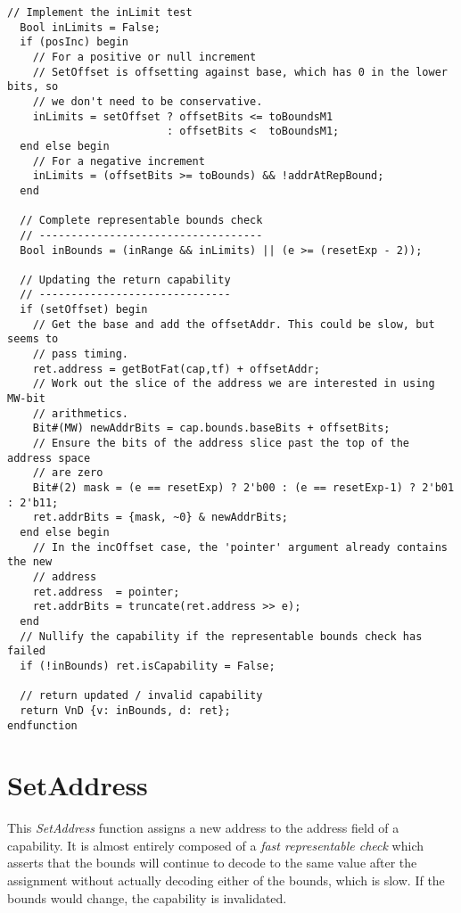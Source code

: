 \begin{lstlisting}[language=bluespec]
  // Implement the inLimit test
  Bool inLimits = False;
  if (posInc) begin
    // For a positive or null increment
    // SetOffset is offsetting against base, which has 0 in the lower bits, so
    // we don't need to be conservative.
    inLimits = setOffset ? offsetBits <= toBoundsM1
                         : offsetBits <  toBoundsM1;
  end else begin
    // For a negative increment
    inLimits = (offsetBits >= toBounds) && !addrAtRepBound;
  end

  // Complete representable bounds check
  // -----------------------------------
  Bool inBounds = (inRange && inLimits) || (e >= (resetExp - 2));

  // Updating the return capability
  // ------------------------------
  if (setOffset) begin
    // Get the base and add the offsetAddr. This could be slow, but seems to
    // pass timing.
    ret.address = getBotFat(cap,tf) + offsetAddr;
    // Work out the slice of the address we are interested in using MW-bit
    // arithmetics.
    Bit#(MW) newAddrBits = cap.bounds.baseBits + offsetBits;
    // Ensure the bits of the address slice past the top of the address space
    // are zero
    Bit#(2) mask = (e == resetExp) ? 2'b00 : (e == resetExp-1) ? 2'b01 : 2'b11;
    ret.addrBits = {mask, ~0} & newAddrBits;
  end else begin
    // In the incOffset case, the 'pointer' argument already contains the new
    // address
    ret.address  = pointer;
    ret.addrBits = truncate(ret.address >> e);
  end
  // Nullify the capability if the representable bounds check has failed
  if (!inBounds) ret.isCapability = False;

  // return updated / invalid capability
  return VnD {v: inBounds, d: ret};
endfunction
\end{lstlisting}

\section{SetAddress}
\label{sec:cheri-128-listings-setaddress}

This \emph{SetAddress} function assigns a new address to the address field
of a capability.
It is almost entirely composed of a \emph{fast representable check} which asserts
that the bounds will continue to decode to the same value after the assignment
without actually decoding either of the bounds, which is slow.
If the bounds would change, the capability is invalidated.

